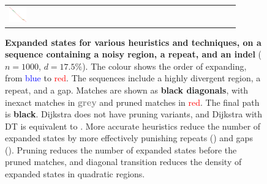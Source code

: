 \begin{figure}[t]
\begin{tabular}{l>{\centering}m{0.18\linewidth}>{\centering}m{0.18\linewidth}>{\centering}m{0.18\linewidth}>{\centering\arraybackslash}m{0.35\linewidth}}
    \includegraphics[scale=0.15]{imgs/comparison/gcsh-dt.png} \\
  \end{tabular}
  \caption{\textbf{Expanded states for various heuristics and techniques, on a
      sequence containing a noisy region, a repeat, and an indel} ($n{=}1000$,
      $d{=}17.5\%$). The colour shows the order of expanding, from
      \textcolor{blue}{blue} to \textcolor{red}{red}. The sequences include a
      highly divergent region, a repeat, and a gap. Matches are shown as
      \textbf{black diagonals}, with inexact matches in
      \textbf{\textcolor{gray}{grey}} and pruned matches in
      \textcolor{red}{red}. The final path is \textbf{black}. Dijkstra does not
      have pruning variants, and Dijkstra with DT is equivalent to \oldwfa. More
      accurate heuristics reduce the number of expanded states by more
      effectively punishing repeats (\CSH) and gaps (\GCH). Pruning reduces the
      number of expanded states before the pruned matches, and diagonal
      transition reduces the density of expanded states in quadratic regions.}
  \label{fig:comparison}
\end{figure}

